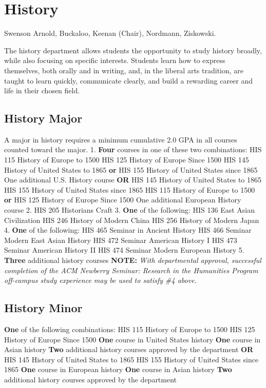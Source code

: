 \documentclass[
  letterpaper,
]{scrbook}
\begin{document}
\hypertarget{sec-history}{%
\section{History}\label{sec-history}}

Swenson Arnold, Buckaloo, Keenan (Chair), Nordmann, Ziskowski.

The history department allows students the opportunity to study history
broadly, while also focusing on specific interests. Students learn how
to express themselves, both orally and in writing, and, in the liberal
arts tradition, are taught to learn quickly, communicate clearly, and
build a rewarding career and life in their chosen field.

\hypertarget{history-major}{%
\subsection{History Major}\label{history-major}}

A major in history requires a minimum cumulative 2.0 GPA in all courses
counted toward the major. 1. \textbf{Four} courses in one of these two
combinations: HIS 115 History of Europe to 1500 HIS 125 History of
Europe Since 1500 HIS 145 History of United States to 1865 \textbf{or}
HIS 155 History of United States since 1865 One additional U.S. History
course \textbf{OR} HIS 145 History of United States to 1865 HIS 155
History of United States since 1865 HIS 115 History of Europe to 1500
\textbf{or} HIS 125 History of Europe Since 1500 One additional European
History course 2. HIS 205 Historians Craft 3. \textbf{One} of the
following: HIS 136 East Asian Civilization HIS 246 History of Modern
China HIS 256 History of Modern Japan 4. \textbf{One} of the following:
HIS 465 Seminar in Ancient History HIS 466 Seminar Modern East Asian
History HIS 472 Seminar American History I HIS 473 Seminar American
History II HIS 474 Seminar Modern European History 5. \textbf{Three}
additional history courses \textbf{NOTE:} \emph{With departmental
approval, successful completion of the ACM Newberry Seminar: Research in
the Humanities Program off-campus study experience may be used to
satisfy \#4 above.}

\hypertarget{history-minor}{%
\subsection{History Minor}\label{history-minor}}

\textbf{One} of the following combinations: HIS 115 History of Europe to
1500 HIS 125 History of Europe Since 1500 \textbf{One} course in United
States history \textbf{One} course in Asian history \textbf{Two}
additional history courses approved by the department \textbf{OR} HIS
145 History of United States to 1865 HIS 155 History of United States
since 1865 \textbf{One} course in European history \textbf{One} course
in Asian history \textbf{Two} additional history courses approved by the
department
\end{document}
